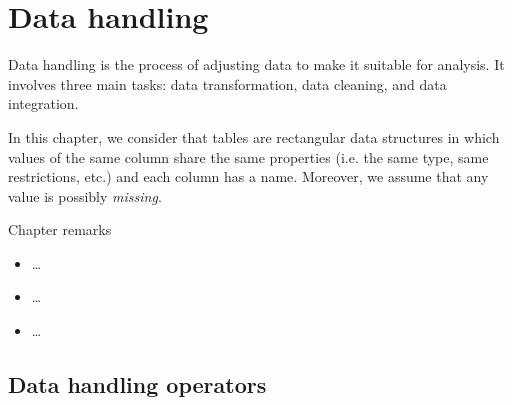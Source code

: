 \chapter{Data handling}
\label{chap:handling}



Data handling is the process of adjusting data to make it suitable for analysis.
It involves three main tasks: data transformation, data cleaning, and data integration.

In this chapter, we consider that tables are rectangular data structures in which values
of the same column share the same properties (i.e. the same type, same restrictions, etc.)
and each column has a name.  Moreover, we assume that any value is possibly
\emph{missing}.

\begin{mainbox}{Chapter remarks}


  \startcontents[chapters]
  \vspace{1em}


  \begin{itemize}
    \item \dots
  \end{itemize}


  \begin{itemize}
    \item \dots
  \end{itemize}


  \begin{itemize}
    \item \dots
  \end{itemize}
\end{mainbox}

{}
\clearpage

\section{Data handling operators}

